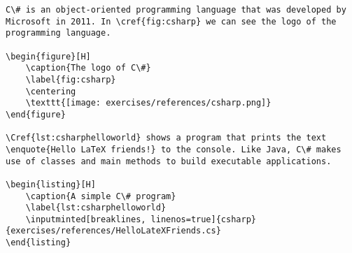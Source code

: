 \begin{verbatim}
C\# is an object-oriented programming language that was developed by Microsoft in 2011. In \cref{fig:csharp} we can see the logo of the programming language.  

\begin{figure}[H]
	\caption{The logo of C\#}
	\label{fig:csharp}
	\centering
	\texttt{[image: exercises/references/csharp.png]}
\end{figure}

\Cref{lst:csharphelloworld} shows a program that prints the text \enquote{Hello LaTeX friends!} to the console. Like Java, C\# makes use of classes and main methods to build executable applications. 

\begin{listing}[H]
	\caption{A simple C\# program}
	\label{lst:csharphelloworld}
	\inputminted[breaklines, linenos=true]{csharp}{exercises/references/HelloLateXFriends.cs}
\end{listing}	
\end{verbatim}